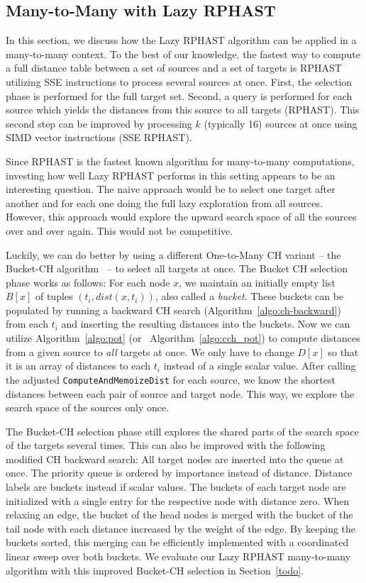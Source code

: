\documentclass[manuscript,review]{acmart}
\begin{document}
\subsection{Many-to-Many with Lazy RPHAST}

In this section, we discuss how the Lazy RPHAST algorithm can be applied in a many-to-many context.
To the best of our knowledge, the fastest way to compute a full distance table between a set of sources and a set of targets is RPHAST utilizing SSE instructions to process several sources at once.
First, the selection phase is performed for the full target set.
Second, a query is performed for each source which yields the distances from this source to all targets (RPHAST).
This second step can be improved by processing $k$ (typically 16) sources at once using SIMD vector instructions (SSE RPHAST).

Since RPHAST is the fastest known algorithm for many-to-many computations, investing how well Lazy RPHAST performs in this setting appears to be an interesting question.
The naive approach would be to select one target after another and for each one doing the full lazy exploration from all sources.
However, this approach would explore the upward search space of all the sources over and over again.
This would not be competitive.

Luckily, we can do better by using a different One-to-Many CH variant -- the Bucket-CH algorithm~\cite{gssv-erlrn-12} -- to select all targets at once.
The Bucket CH selection phase works as follows:
For each node $x$, we maintain an initially empty list $B[x]$ of tuples $(t_i, dist(x,t_i))$, also called a \emph{bucket}.
These buckets can be populated by running a backward CH search (Algorithm~\ref{algo:ch-backward}) from each $t_i$ and inserting the resulting distances into the buckets.
Now we can utilize Algorithm~\ref{algo:pot} (or~ Algorithm~\ref{algo:cch_pot}) to compute distances from a given source to \emph{all} targets at once.
We only have to change $D[x]$ so that it is an array of distances to each $t_i$ instead of a single scalar value.
After calling the adjusted \texttt{ComputeAndMemoizeDist} for each source, we know the shortest distances between each pair of source and target node.
This way, we explore the search space of the sources only once.

The Bucket-CH selection phase still explores the shared parts of the search space of the targets several times.
This can also be improved with the following modified CH backward search:
All target nodes are inserted into the queue at once.
The priority queue is ordered by importance instead of distance.
Distance labels are buckets instead if scalar values.
The buckets of each target node are initialized with a single entry for the respective node with distance zero.
When relaxing an edge, the bucket of the head nodes is merged with the bucket of the tail node with each distance increased by the weight of the edge.
By keeping the buckets sorted, this merging can be efficiently implemented with a coordinated linear sweep over both buckets.
We evaluate our Lazy RPHAST many-to-many algorithm with this improved Bucket-CH selection in Section~\ref{todo}.
\end{document}
